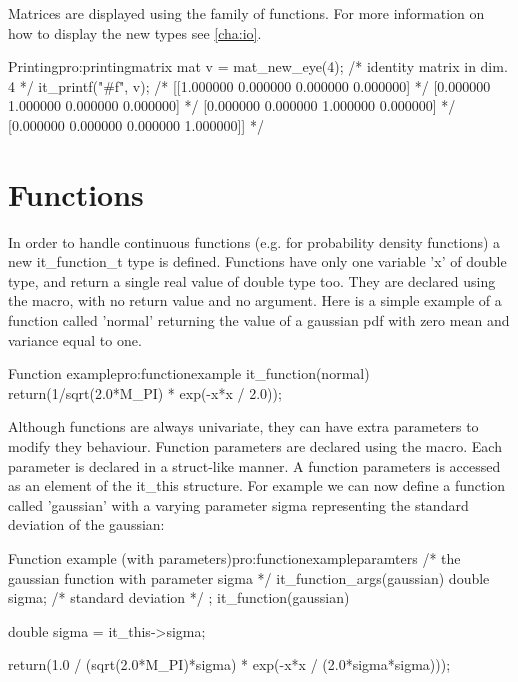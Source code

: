     Matrices are displayed using the  family of
    functions. For more information on how to display the new types
    see \ref{cha:io}.

\begin{program}{Printing}{pro:printingmatrix}
mat v = mat_new_eye(4);       /* identity matrix in dim. 4 */
it_printf("#f\n", v); /* [[1.000000 0.000000 0.000000 0.000000]  */
                          [0.000000 1.000000 0.000000 0.000000]  */
                          [0.000000 0.000000 1.000000 0.000000]  */
                          [0.000000 0.000000 0.000000 1.000000]] */
\end{program}

\section{Functions}
\label{sec:functions}

      In order to handle continuous functions (e.g. for probability
      density functions) a new it\_function\_t type is
      defined. Functions have only one variable 'x' of double type,
      and return a single real value of double type too. They are
      declared using the  macro, with no return
      value and no argument. Here is a simple example of a function
      called 'normal' returning the value of a gaussian pdf with zero
      mean and variance equal to one.

\begin{program}{Function example}{pro:functionexample}
it\_function(normal)
{
  return(1/sqrt(2.0*M_PI) * exp(-x*x / 2.0));
}
\end{program}

      Although functions are always univariate, they can have extra
      parameters to modify they behaviour. Function parameters are
      declared using the  macro. Each
      parameter is declared in a struct-like manner. A function
      parameters is accessed as an element of the it\_this
      structure. For example we can now define a function called
      'gaussian' with a varying parameter sigma representing the
      standard deviation of the gaussian:

\begin{program}{Function example (with parameters)}{pro:functionexampleparamters}
/* the gaussian function with parameter sigma */
it_function_args(gaussian) {
  double sigma;  /* standard deviation */
};
it_function(gaussian)
{
  double sigma = it_this->sigma;

  return(1.0 / (sqrt(2.0*M_PI)*sigma) * exp(-x*x / (2.0*sigma*sigma)));
}
\end{program}

